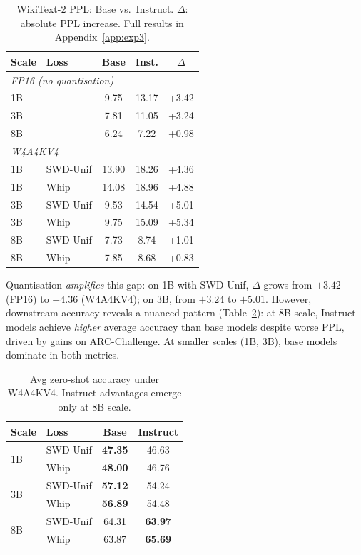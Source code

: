 \documentclass[11pt,a4paper]{article}
\newcommand{\best}[1]{\textbf{#1}}
\begin{document}
\begin{table}[t]
\centering
\caption{WikiText-2 PPL: Base vs.\ Instruct. $\Delta$: absolute PPL increase. Full results in Appendix~\ref{app:exp3}.}
\label{tab:exp3_ppl}
\vspace{0.3em}
\small
\begin{tabular}{ll ccc}
\toprule
\textbf{Scale} & \textbf{Loss} & \textbf{Base} & \textbf{Inst.} & $\Delta$ \\
\midrule
\multicolumn{5}{l}{\emph{FP16 (no quantisation)}} \\
\midrule
1B & & 9.75 & 13.17 & +3.42 \\
3B & & 7.81 & 11.05 & +3.24 \\
8B & & 6.24 & 7.22 & +0.98 \\
\midrule
\multicolumn{5}{l}{\emph{W4A4KV4}} \\
\midrule
1B & SWD-Unif & 13.90 & 18.26 & +4.36 \\
1B & Whip     & 14.08 & 18.96 & +4.88 \\
3B & SWD-Unif & 9.53  & 14.54 & +5.01 \\
3B & Whip     & 9.75  & 15.09 & +5.34 \\
8B & SWD-Unif & 7.73  & 8.74  & +1.01 \\
8B & Whip     & 7.85  & 8.68  & +0.83 \\
\bottomrule
\end{tabular}
\end{table}
 
Quantisation \emph{amplifies} this gap: on 1B with SWD-Unif, $\Delta$ grows from $+3.42$ (FP16) to $+4.36$ (W4A4KV4); on 3B, from $+3.24$ to $+5.01$. However, downstream accuracy reveals a nuanced pattern (Table~\ref{tab:exp3_acc}): at 8B scale, Instruct models achieve \emph{higher} average accuracy than base models despite worse PPL, driven by gains on ARC-Challenge. At smaller scales (1B, 3B), base models dominate in both metrics.
 
\begin{table}[t]
\centering
\caption{Avg zero-shot accuracy under W4A4KV4. Instruct advantages emerge only at 8B scale.}
\label{tab:exp3_acc}
\vspace{0.3em}
\small
\begin{tabular}{ll cc}
\toprule
\textbf{Scale} & \textbf{Loss} & \textbf{Base} & \textbf{Instruct} \\
\midrule
\multirow{2}{*}{1B}
  & SWD-Unif  & \best{47.35} & 46.63 \\
  & Whip      & \best{48.00} & 46.76 \\
\midrule
\multirow{2}{*}{3B}
  & SWD-Unif  & \best{57.12} & 54.24 \\
  & Whip      & \best{56.89} & 54.48 \\
\midrule
\multirow{2}{*}{8B}
  & SWD-Unif  & 64.31 & \best{63.97} \\
  & Whip      & 63.87 & \best{65.69} \\
\bottomrule
\end{tabular}
\end{table}
 
\end{document}
